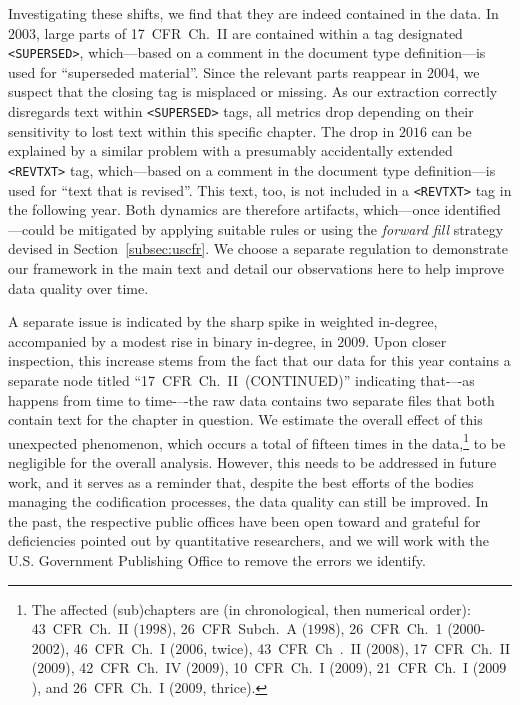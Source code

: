\documentclass[utf8,sort&compress,numbers,square,table,hidelinks]{frontiers_suppmat} %
\begin{document}
Investigating these shifts, we find that they are indeed contained in the data.
In $2003$, large parts of 17~CFR~Ch.~II are contained within a tag designated \texttt{<SUPERSED>}, which---based on a comment in the document type definition---is used for ``superseded material''.
Since the relevant parts reappear in $2004$, we suspect that the closing tag is misplaced or missing.
As our extraction correctly disregards text within \texttt{<SUPERSED>} tags, all metrics drop depending on their sensitivity to lost text within this specific chapter.
The drop in $2016$ can be explained by a similar problem with a presumably accidentally extended \texttt{<REVTXT>} tag,
which---based on a comment in the document type definition---is used for ``text that is revised''.
This text, too, is not included in a \texttt{<REVTXT>} tag in the following year.
Both dynamics are therefore artifacts, which---once identified---could be mitigated by applying suitable rules or using the \emph{forward fill} strategy devised in Section~\ref{subsec:uscfr}.
We choose a separate regulation to demonstrate our framework in the main text and detail our observations here to help improve data quality over time.

A separate issue is indicated by the sharp spike in weighted in-degree, accompanied by a modest rise in binary in-degree, in $2009$.
Upon closer inspection, this increase stems from the fact that our data for this year contains a separate node titled ``17~CFR~Ch.~II~(CONTINUED)'' indicating that-–-as happens from time to time-–-the raw data contains two separate files that both contain text for the chapter in question.
We estimate the overall effect of this unexpected phenomenon, which occurs a total of fifteen times in the data,\footnote{%
The affected (sub)chapters are (in chronological, then numerical order):
43~CFR~Ch.~II ($1998$),
26~CFR~Subch.~A ($1998$),
26~CFR~Ch.~1 ($2000$-$2002$),
46~CFR~Ch.~I ($2006$, twice),
43~CFR~Ch~.~II ($2008$),
17~CFR~Ch.~II ($2009$),
42~CFR~Ch.~IV ($2009$),
10~CFR~Ch.~I ($2009$),
21~CFR~Ch.~I ($2009$), and
26~CFR~Ch.~I ($2009$, thrice).
} to be negligible for the overall analysis.
However, this needs to be addressed in future work, and it serves as a reminder that, despite the best efforts of the bodies managing the codification processes, the data quality can still be improved.
In the past, the respective public offices have been open toward and grateful for deficiencies pointed out by quantitative researchers,
and we will work with the U.S. Government Publishing Office to remove the errors we identify.
\end{document}
